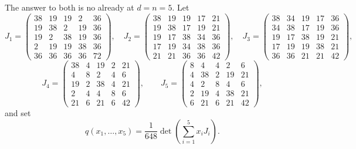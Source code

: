 The answer to both is no already at $d=n=5$.  Let
\begingroup
\scriptsize
\[
J_1=
\begin{pmatrix}
38&19&19&2&36\\
19&38&2&19&36\\
19&2&38&19&36\\
2&19&19&38&36\\
36&36&36&36&72
\end{pmatrix},\quad
J_2=
\begin{pmatrix}
38&19&19&17&21\\
19&38&17&19&21\\
19&17&38&34&36\\
17&19&34&38&36\\
21&21&36&36&42
\end{pmatrix},\quad
J_3=
\begin{pmatrix}
38&34&19&17&36\\
34&38&17&19&36\\
19&17&38&19&21\\
17&19&19&38&21\\
36&36&21&21&42
\end{pmatrix},
\]
\[
J_4=
\begin{pmatrix}
38&4&19&2&21\\
4&8&2&4&6\\
19&2&38&4&21\\
2&4&4&8&6\\
21&6&21&6&42
\end{pmatrix},\qquad
J_5=
\begin{pmatrix}
8&4&4&2&6\\
4&38&2&19&21\\
4&2&8&4&6\\
2&19&4&38&21\\
6&21&6&21&42
\end{pmatrix},
\]
\endgroup
and set
\begin{equation}\label{eq:aim36-q}
q(x_1,\ldots,x_5)=\frac1{648}\det\left(\sum_{i=1}^5x_iJ_i\right).
\end{equation}

